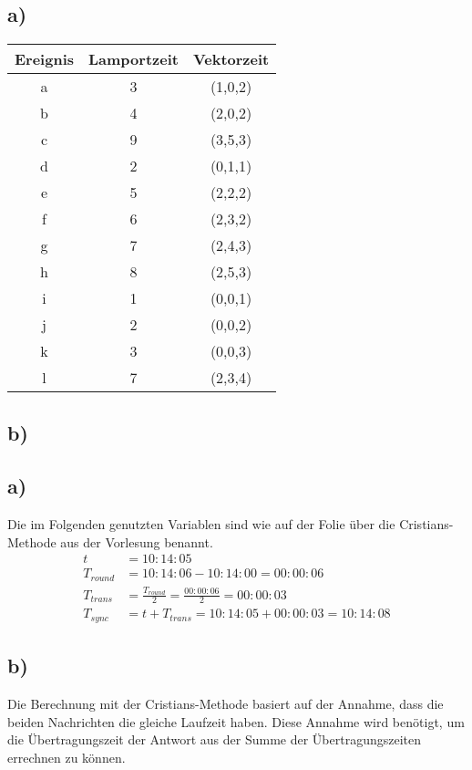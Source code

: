 \documentclass[ngerman]{fbi-aufgabenblatt}
\begin{document}
	\setcounter{section}{0}

	
	\subsection*{a)}
	\begin{tabular}{c|c|c}
		Ereignis & Lamportzeit & Vektorzeit \\
		\hline
		a & 3 & (1,0,2)\\
		b & 4 & (2,0,2) \\
		c & 9 & (3,5,3) \\
		
		d & 2 & (0,1,1) \\
		e & 5 & (2,2,2) \\
		f & 6 & (2,3,2) \\
		g & 7 & (2,4,3) \\
		h & 8 & (2,5,3) \\
		
		i & 1 & (0,0,1) \\
		j & 2 & (0,0,2) \\
		k & 3 & (0,0,3) \\
		l & 7 & (2,3,4) \\
	\end{tabular}

	\subsection*{b)}
	
    
	
	\subsection*{a)}
	Die im Folgenden genutzten Variablen sind wie auf der Folie über die Cristians-Methode aus der Vorlesung benannt.
	\begin{align*}
		t&=10:14:05\\
		T_{round} &= 10:14:06 - 10:14:00 = 00:00:06 \\
		T_{trans} &= \frac{T_{round}}{2}= \frac{00:00:06}{2}=00:00:03 \\
		T_{sync} &= t+T_{trans} = 10:14:05+00:00:03 = 10:14:08
	\end{align*}
	\subsection*{b)}
	Die Berechnung mit der Cristians-Methode basiert auf der Annahme, dass die beiden Nachrichten die gleiche Laufzeit haben. Diese Annahme wird benötigt, um die Übertragungszeit der Antwort aus der Summe der Übertragungszeiten errechnen zu können.
	
\end{document}
